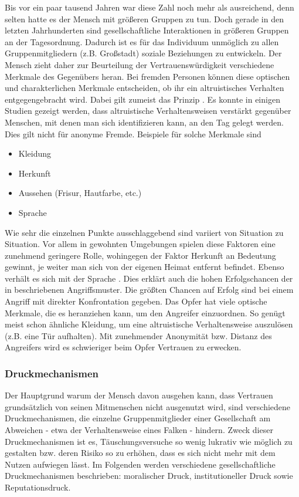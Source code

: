Bis vor ein paar tausend Jahren war diese Zahl noch mehr als ausreichend, denn selten hatte es der Mensch mit größeren Gruppen zu tun.
Doch gerade in den letzten Jahrhunderten sind gesellschaftliche Interaktionen in größeren Gruppen an der Tagesordnung.
Dadurch ist es für das Individuum unmöglich zu allen Gruppenmitgliedern (z.B. Großstadt) soziale Beziehungen zu entwickeln.
Der Mensch zieht daher zur Beurteilung der Vertrauenswürdigkeit verschiedene Merkmale des Gegenübers heran.
Bei fremden Personen können diese optischen und charakterlichen Merkmale entscheiden, ob ihr ein altruistisches Verhalten entgegengebracht wird.
Dabei gilt zumeist das Prinzip .
Es konnte in einigen Studien gezeigt werden, dass altruistische Verhaltensweisen verstärkt gegenüber Menschen, mit denen man sich identifizieren kann, an den Tag gelegt werden.
Dies gilt nicht für anonyme Fremde.
Beispiele für solche Merkmale sind
\begin{itemize}
	\item Kleidung
	\item Herkunft
	\item Aussehen (Frisur, Hautfarbe, etc.)
	\item Sprache
\end{itemize}
Wie sehr die einzelnen Punkte ausschlaggebend sind variiert von Situation zu Situation.
Vor allem in gewohnten Umgebungen spielen diese Faktoren eine zunehmend geringere Rolle, wohingegen der Faktor Herkunft an Bedeutung gewinnt, je weiter man sich von der eigenen Heimat entfernt befindet. Ebenso verhält es sich mit der Sprache \citep{liars-and-outliers}.
Dies erklärt auch die hohen Erfolgschancen der in  beschriebenen Angriffsmuster.
Die größten Chancen auf Erfolg sind bei einem Angriff mit direkter Konfrontation gegeben.
Das Opfer hat viele optische Merkmale, die es heranziehen kann, um den Angreifer einzuordnen.
So genügt meist schon ähnliche Kleidung, um eine altruistische Verhaltensweise auszulösen (z.B. eine Tür aufhalten).
Mit zunehmender Anonymität bzw. Distanz des Angreifers wird es schwieriger beim Opfer Vertrauen zu erwecken.

\subsubsection{Druckmechanismen}\label{sec:druckmechanismen}
Der Hauptgrund warum der Mensch davon ausgehen kann, dass Vertrauen grundsätzlich von seinen Mitmenschen nicht ausgenutzt wird, sind verschiedene Druckmechanismen, die einzelne Gruppenmitglieder einer Gesellschaft am Abweichen - etwa der Verhaltensweise eines Falken - hindern.
Zweck dieser Druckmechanismen ist es, Täuschungsversuche so wenig lukrativ wie möglich zu gestalten bzw. deren Risiko so zu erhöhen, dass es sich nicht mehr mit dem Nutzen aufwiegen lässt.
Im Folgenden werden verschiedene gesellschaftliche Druckmechanismen beschrieben: moralischer Druck, institutioneller Druck sowie Reputationsdruck.

